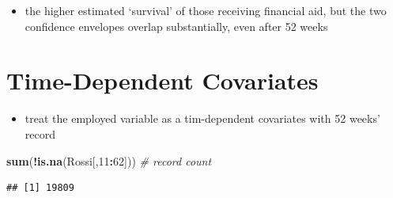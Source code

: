 \documentclass[]{book}
\newenvironment{Shaded}{\begin{snugshade}}{\end{snugshade}}
\newcommand{\CommentTok}[1]{\textcolor[rgb]{0.56,0.35,0.01}{\textit{#1}}}
\newcommand{\DecValTok}[1]{\textcolor[rgb]{0.00,0.00,0.81}{#1}}
\newcommand{\KeywordTok}[1]{\textcolor[rgb]{0.13,0.29,0.53}{\textbf{#1}}}
\newcommand{\NormalTok}[1]{#1}
\newcommand{\OperatorTok}[1]{\textcolor[rgb]{0.81,0.36,0.00}{\textbf{#1}}}
\providecommand{\tightlist}{%
  \setlength{\itemsep}{0pt}\setlength{\parskip}{0pt}}
\begin{document}
\begin{itemize}
\tightlist
\item
  the higher estimated `survival' of those receiving financial aid, but the two confidence envelopes overlap substantially, even after 52 weeks
\end{itemize}

\hypertarget{time-dependent-covariates}{%
\section{Time-Dependent Covariates}\label{time-dependent-covariates}}

\begin{itemize}
\tightlist
\item
  treat the employed variable as a tim-dependent covariates with 52 weeks' record
\end{itemize}

\begin{Shaded}
\begin{Highlighting}[]
\KeywordTok{sum}\NormalTok{(}\OperatorTok{!}\KeywordTok{is.na}\NormalTok{(Rossi[,}\DecValTok{11}\OperatorTok{:}\DecValTok{62}\NormalTok{])) }\CommentTok{# record count}
\end{Highlighting}
\end{Shaded}

\begin{verbatim}
## [1] 19809
\end{verbatim}
\end{document}
